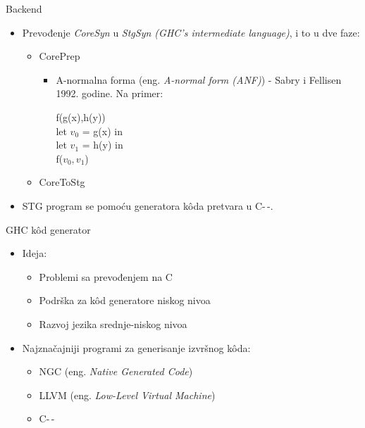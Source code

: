 \documentclass{beamer}
\begin{document}
\begin{frame}{Backend}

	\begin{itemize}
		\item 	Prevođenje \textit{CoreSyn} u \textit{StgSyn (GHC’s intermediate language)}, i to u dve faze:
		\begin{itemize}
			\item CorePrep 
			\begin{itemize}
				\item A-normalna forma (eng. \emph{A-normal form (ANF)}) -  Sabry i Fellisen 1992. godine.
				Na primer:
				\begin{block}{}
					f(g(x),h(y))\\
					let $ v_{0} $ = g(x) in \\
					let $ v_{1} $ = h(y) in  \\
					f($ v_{0}, v_{1} $) 
				\end{block}
				
			\end{itemize} 
			\item CoreToStg
		\end{itemize}
		
		\vspace{0.5cm}
		
		\item STG program se pomoću generatora k\^{o}da pretvara u C-\,-.
	\end{itemize}

\end{frame}

\begin{frame}{GHC k\^{o}d generator}
	
	\begin{itemize}
		\item Ideja:
		
		\begin{itemize}
			\item Problemi sa prevođenjem na C
			\item Podrška za k\^{o}d generatore niskog nivoa
			\item Razvoj jezika srednje-niskog nivoa
		\end{itemize}
	\end{itemize}

	\begin{itemize}
		\item Najznačajniji programi za generisanje izvršnog k\^{o}da:
		
		\begin{itemize}
			\item NGC (eng. \emph{Native Generated Code})
			\item LLVM (eng. \emph{Low-Level Virtual Machine})
			\item C-\,-
		\end{itemize}
	\end{itemize}
	
\end{frame}
\end{document}
